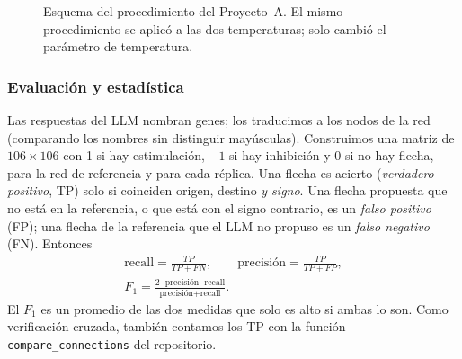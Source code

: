 \documentclass[unnumsec,webpdf,contemporary,large]{oup-authoring-template}
\begin{document}
\begin{figure}[t]
\centering
{}
\caption{Esquema del procedimiento del Proyecto~A. El mismo procedimiento se aplicó a las dos temperaturas; solo cambió el parámetro de temperatura.\label{fig:esquema}}
\end{figure}

\subsubsection{Evaluación y estadística}

Las respuestas del LLM nombran genes; los traducimos a los nodos de la red (comparando los nombres sin distinguir mayúsculas). Construimos una matriz de $106\times106$ con 1 si hay estimulación, $-1$ si hay inhibición y 0 si no hay flecha, para la red de referencia y para cada réplica. Una flecha es acierto (\emph{verdadero positivo}, TP) solo si coinciden origen, destino \emph{y signo}. Una flecha propuesta que no está en la referencia, o que está con el signo contrario, es un \emph{falso positivo} (FP); una flecha de la referencia que el LLM no propuso es un \emph{falso negativo} (FN). Entonces
\begin{gather}
\text{recall}=\frac{TP}{TP+FN},\qquad
\text{precisión}=\frac{TP}{TP+FP},\nonumber\\
F_1=\frac{2\cdot\text{precisión}\cdot\text{recall}}{\text{precisión}+\text{recall}}.
\label{eq:metricas}
\end{gather}
El $F_1$ es un promedio de las dos medidas que solo es alto si ambas lo son. Como verificación cruzada, también contamos los TP con la función \texttt{compare\_connections} del repositorio.
\end{document}
